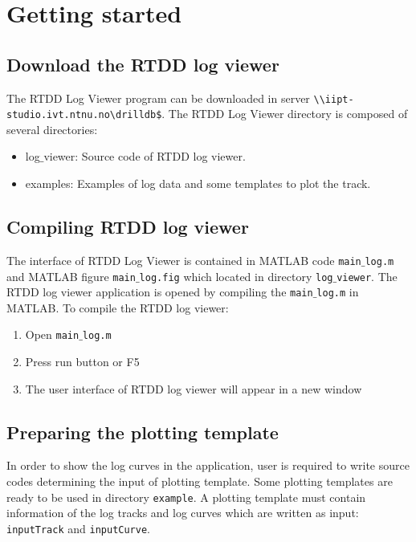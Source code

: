 \documentclass[12pt,a4paper,oneside]{report}
\begin{document}
\chapter{Getting started}
\section{Download the RTDD log viewer}
The RTDD Log Viewer program can be downloaded in server \texttt{\textbackslash\textbackslash iipt-studio.ivt.ntnu.no\textbackslash drilldb\$}. The RTDD Log Viewer directory is composed of several directories:
\begin{itemize}
\setlength\itemsep{0.1em}
\item log$\_$viewer: Source code of RTDD log viewer.
\item examples: Examples of log data and some templates to plot the track.
\end{itemize}

\section{Compiling RTDD log viewer}
The interface of RTDD Log Viewer is contained in MATLAB code \texttt{main$\_$log.m} and MATLAB figure \texttt{main$\_$log.fig} which located in directory \texttt{log$\_$viewer}. The RTDD log viewer application is opened by compiling the \texttt{main$\_$log.m} in MATLAB. To compile the RTDD log viewer:
\begin{enumerate}
\item Open \texttt{main$\_$log.m}
\item Press run button or F5
\item The user interface of RTDD log viewer will appear in a new window
\end{enumerate}

\section{Preparing the plotting template}
\label{ch:plot_template}
In order to show the log curves in the application, user is required to write source codes determining the input of plotting template. Some plotting templates are ready to be used in directory \texttt{example}. A plotting template must contain information of the log tracks and log curves which are written as input: \texttt{inputTrack} and \texttt{inputCurve}.
\end{document}
